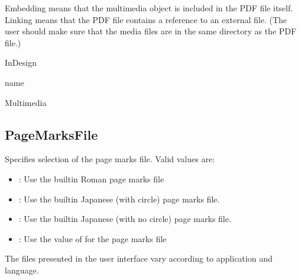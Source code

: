 \documentclass[letterpaper,12pt,english,openany,oneside]{sphinxmanual}
\begin{document}
Embedding means that the multimedia object is included in the PDF file itself. Linking means that the PDF file contains a reference to an external file. (The user should make sure that the media files are in the same directory as the PDF file.)

\label{\detokenize{PDF_Create_NewNamespaces:supported-by-19}}

InDesign

\label{\detokenize{PDF_Create_NewNamespaces:type-19}}

name

\label{\detokenize{PDF_Create_NewNamespaces:ui-name-19}}

Multimedia

\label{\detokenize{PDF_Create_NewNamespaces:default-value-18}}

\begin{sphinxVerbatim}[commandchars=\\\{\}]
\end{sphinxVerbatim}


\subsection{PageMarksFile}
\label{\detokenize{PDF_Create_NewNamespaces:pagemarksfile}}
Specifies selection of the page marks file. Valid values are:
\begin{itemize}
\item {} 
 : Use the built\sphinxhyphen{}in Roman page marks file

\item {} 
 : Use the built\sphinxhyphen{}in Japanese (with circle) page marks file.

\item {} 
 : Use the built\sphinxhyphen{}in Japanese (with no circle) page marks file.

\item {} 
 : Use the value of  for the page marks file

\end{itemize}

The files presented in the user interface vary according to application and language.
\end{document}
